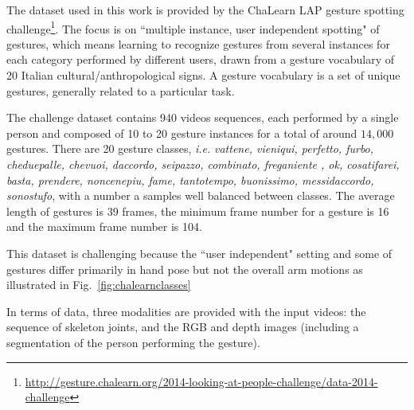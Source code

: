 The dataset used in this work is provided by the ChaLearn LAP \cite{chalearnLAP} gesture spotting challenge\footnote{\href{http://gesture.chalearn.org/2014-looking-at-people-challenge/data-2014-challenge}{http://gesture.chalearn.org/2014-looking-at-people-challenge/data-2014-challenge}}.
%
The focus  is on ``multiple instance, user independent spotting" of gestures, which means learning to recognize gestures from several instances for each category performed by different users, drawn from a gesture vocabulary of 20 Italian cultural/anthropological signs.
A gesture vocabulary is a set of unique gestures, generally related to a particular task.

The challenge dataset contains 940 videos sequences, each performed by a single person and composed of 10 to 20 gesture instances for a total of around $14,000$ gestures.
%
There are 20 gesture classes, \emph{i.e.} \emph{vattene, vieniqui, perfetto, furbo, cheduepalle, chevuoi, daccordo, seipazzo, combinato, freganiente
    , ok, cosatifarei, basta, prendere, noncenepiu, fame, tantotempo, buonissimo, messidaccordo, sonostufo}, with a number a samples well balanced between classes.
The average length of gestures is 39 frames, the minimum frame number for a gesture is 16  and the maximum frame number is 104.

This dataset is challenging because the ``user independent" setting and some of gestures differ primarily in hand pose but not the overall arm motions as illustrated in Fig.~\ref{fig:chalearnclasses}


In terms of data, three modalities are provided with the input videos: the sequence of skeleton joints, and the RGB and depth images
(including a segmentation of the person performing the gesture).

